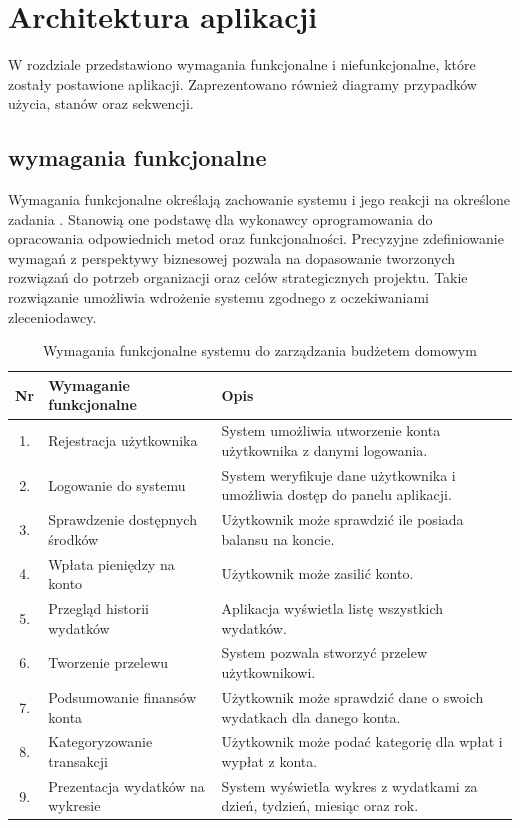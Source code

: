 \chapter{Architektura aplikacji}
W rozdziale przedstawiono wymagania funkcjonalne i niefunkcjonalne, które zostały postawione aplikacji. Zaprezentowano również diagramy przypadków użycia, stanów oraz sekwencji.
\section{wymagania funkcjonalne}
Wymagania funkcjonalne określają zachowanie systemu i jego reakcji na określone zadania \cite{Wymagania}. Stanowią one podstawę dla wykonawcy oprogramowania do opracowania odpowiednich metod oraz funkcjonalności. Precyzyjne zdefiniowanie wymagań z perspektywy biznesowej pozwala na dopasowanie tworzonych rozwiązań do potrzeb organizacji oraz celów strategicznych projektu. Takie rozwiązanie umożliwia wdrożenie systemu zgodnego z oczekiwaniami zleceniodawcy.

\begin{longtable}{|c|p{5cm}|p{8cm}|}
	\caption{Wymagania funkcjonalne systemu do zarządzania budżetem domowym}
	\label{tab:wymagania_funkcjonalne} \\
	\hline
	\textbf{Nr} & \textbf{Wymaganie funkcjonalne} & \textbf{Opis} \\ \hline
	
	1. & Rejestracja użytkownika & System umożliwia utworzenie konta użytkownika z danymi logowania. \\ \hline
	2. & Logowanie do systemu & System weryfikuje dane użytkownika i umożliwia dostęp do panelu aplikacji. \\ \hline
	3. & Sprawdzenie dostępnych środków & Użytkownik może sprawdzić ile posiada balansu na koncie. \\ \hline
	4. & Wpłata pieniędzy na konto & Użytkownik może zasilić konto. \\ \hline
	5. & Przegląd historii wydatków & Aplikacja wyświetla listę wszystkich wydatków. \\ \hline
	6. & Tworzenie przelewu & System pozwala stworzyć przelew użytkownikowi. \\ \hline
	7. & Podsumowanie finansów konta & Użytkownik może sprawdzić dane o swoich wydatkach dla danego konta. \\ \hline
	8. & Kategoryzowanie transakcji & Użytkownik może podać kategorię dla wpłat i wypłat z konta. \\ \hline
	9. & Prezentacja wydatków na wykresie & System wyświetla wykres z wydatkami za dzień, tydzień, miesiąc oraz rok. \\ \hline
\end{longtable}

